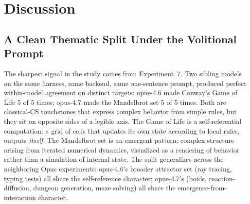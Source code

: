 \documentclass{article}
\begin{document}
\begin{table}[t]
\caption{Experiment~7 supplementary: Prompt~3 on harness 2.1.112
  for the other four Claude models.}
\label{tab:exp7_supp}
\small{}
\end{table}

\section{Discussion}
\label{sec:discussion}

\subsection{A Clean Thematic Split Under the Volitional Prompt}

The sharpest signal in the study comes from
Experiment~7. Two sibling models on the same harness, same
backend, same one-sentence prompt, produced perfect
within-model agreement on distinct targets: opus-4.6 made
Conway's Game of Life 5 of 5 times; opus-4.7 made the
Mandelbrot set 5 of 5 times. Both are classical-CS
touchstones that express complex behavior from simple rules,
but they sit on opposite sides of a legible axis. The Game of
Life is a self-referential computation: a grid of cells that
updates its own state according to local rules, outputs
\emph{itself}. The Mandelbrot set is an emergent pattern:
complex structure arising from iterated numerical dynamics,
visualized as a rendering of behavior rather than a
simulation of internal state. The split generalizes across
the neighboring Opus experiments: opus-4.6's broader
attractor set (ray tracing, typing tests) all share the
self-reference character; opus-4.7's (boids, reaction-%
diffusion, dungeon generation, maze solving) all share the
emergence-from-interaction character.
\end{document}
